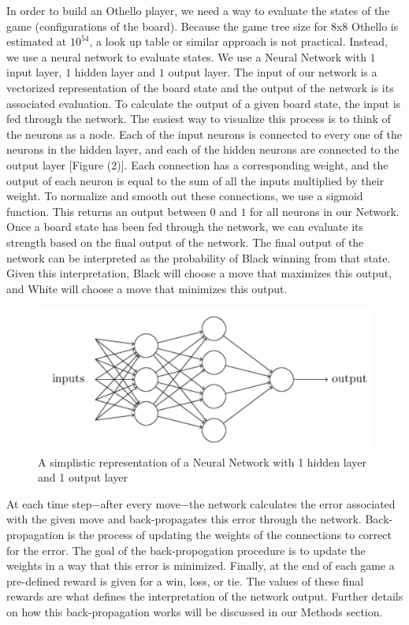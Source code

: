 \documentclass{sig-alternate-05-2015}
\begin{document}
In order to build an Othello player, we need a way to evaluate the states of the game (configurations of the board). Because the game tree size for 8x8 Othello is estimated at $10^54$, a look up table or similar approach is not practical. Instead, we use a neural network to evaluate states. We use a Neural Network with $1$ input layer, $1$ hidden layer and $1$ output layer. The input of our network is a vectorized representation of the board state and the output of the network is its associated evaluation. To calculate the output of a given board state, the input is fed through the network. The easiest way to visualize this process is to think of the neurons as a node. Each of the input neurons is connected to every one of the neurons in the hidden layer, and each of the hidden neurons are connected to the output layer [Figure (2)]. Each connection has a corresponding weight, and the output of each neuron is equal to the sum of all the inputs multiplied by their weight. To normalize and smooth out these connections, we use a sigmoid function. This returns an output between $0$ and $1$ for all neurons in our Network. Once a board state has been fed through the network, we can evaluate its strength based on the final output of the network. The final output of the network can be interpreted as the probability of Black winning from that state. Given this interpretation, Black will choose a move that maximizes this output, and White will choose a move that minimizes this output.

\begin{figure}[h!]
  \includegraphics[width=\linewidth]{simpleNN.png}
  \caption{A simplistic representation of a Neural Network with 1 hidden layer and 1 output layer}
  \label{fig:simpleNN2}
\end{figure}

At each time step$-$after every move$-$the network calculates the error associated with the given move and back-propagates this error through the network. Back-propagation is the process of updating the weights of the connections to correct for the error. The goal of the back-propogation procedure is to update the weights in a way that this error is minimized. Finally, at the end of each game a pre-defined reward is given for a win, loss, or tie.  The values of these final rewards are what defines the interpretation of the network output. Further details on how this back-propagation works will be discussed in our Methods section. 
\end{document}
